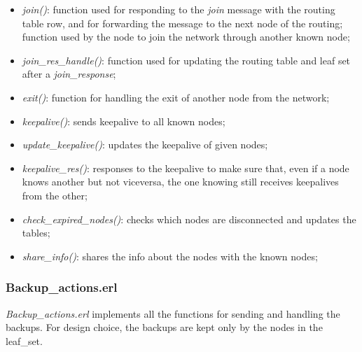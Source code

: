 \documentclass{article}
\begin{document}
\begin{itemize}
    \item \textit{join()}: function used for responding to the \textit{join} message with the routing table row, 
    and for forwarding the message to the next node of the routing; function used by the node to join the network through another known node;
    \item \textit{join\_res\_handle()}: function used for updating the routing table and leaf set after a \textit{join\_response};
    \item \textit{exit()}: function for handling the exit of another node from the network;
    \item \textit{keepalive()}: sends keepalive to all known nodes;
    \item \textit{update\_keepalive()}: updates the keepalive of given nodes;
    \item \textit{keepalive\_res()}: responses to the keepalive to make sure that, even if a node knows another but not viceversa, 
    the one knowing still receives keepalives from the other;
    \item \textit{check\_expired\_nodes()}: checks which nodes are disconnected and updates the tables;
    \item \textit{share\_info()}: shares the info about the nodes with the known nodes;
\end{itemize}

\subsubsection{Backup\_actions.erl}

\textit{Backup\_actions.erl} implements all the functions for sending and handling the backups.
For design choice, the backups are kept only by the nodes in the leaf_set.
\end{document}
